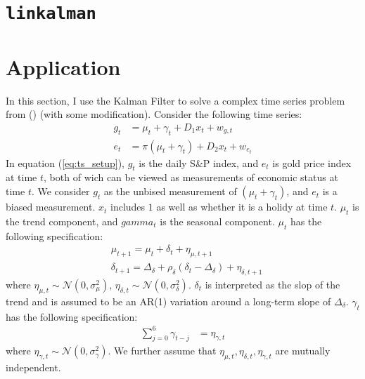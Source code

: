 \documentclass[12pt]{article}
\numberwithin{equation}{section}
\begin{document}
\section{\texttt{linkalman}} \label{sec:codebase}

\section{Application} \label{sec:apply}
In this section, I use the Kalman Filter to solve a complex time series problem from (\cite{brodersen_etal_2015}) (with some modification). Consider the following time series: 
\begin{align}
    g_t &= \mu_t + \gamma_t + D_1x_t + w_{g,t} \label{eq:ts_setup} \\
    e_t &= \pi(\mu_t + \gamma_t) + D_2x_t + w_{e_t}
\end{align}
In equation (\ref{eq:ts_setup}), $g_t$ is the daily S\&P index, and $e_t$ is gold price index at time $t$, both of wich can be viewed as measurements of economic status at time $t$. We consider $g_t$ as the unbised measurement of $(\mu_t+\gamma_t)$, and $e_t$ is a biased measurement. $x_t$ includes $1$ as well as whether it is a holidy at time $t$. $\mu_t$ is the trend component, and $gamma_t$ is the seasonal component. $\mu_t$ has the following specification:
\begin{align}
    &\mu_{t+1} = \mu_{t} + \delta_t + \eta_{\mu,t+1} \\
    &\delta_{t+1} = \Delta_{\delta} + \rho_{\delta}(\delta_t - \Delta_{\delta}) + \eta_{\delta,t+1} 
\end{align}
where $\eta_{\mu,t}\sim\mathcal{N}(0,\sigma_{\mu}^2)$, $\eta_{\delta,t}\sim\mathcal{N}(0,\sigma_{\delta}^2)$. $\delta_t$ is interpreted as the slop of the trend and is assumed to be an AR(1) variation around a long-term slope of $\Delta_{\delta}$. $\gamma_t$ has the following specification:
\begin{align}
    \sum_{j=0}^6\gamma_{t-j} &= \eta_{\gamma,t}
\end{align}
where $\eta_{\gamma,t}\sim\mathcal{N}(0,\sigma_{\gamma}^2)$. We further assume that $\eta_{\mu,t},\eta_{\delta,t},\eta_{\gamma,t}$ are mutually independent. 
\end{document}
